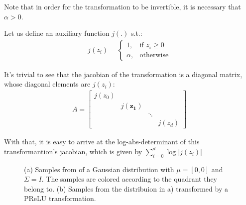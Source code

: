 Note that in order for the transformation to be invertible, it is necessary
that $\alpha > 0$.

Let us define an auxiliary function $j(.)$ s.t.:
\begin{align}
j(z_i) =
    \begin{cases}
       1 ,              & \text{if } z_i \geq 0\\
       \alpha ,       & \text{otherwise}
    \end{cases}
\end{align}

It's trivial to see that the jacobian of the transformation is a diagonal
matrix, whose diagonal elements are $j(z_i)$:
\begin{align}
  A =
  \begin{bmatrix}
      j(z_0) & & & \\
      & j(\mathbf{z_1}) & & \\
      & & \ddots & \\
      & & & j(z_d)
  \end{bmatrix}
\end{align}

With that, it is easy to arrive at the log-abs-determinant of this transformantion's
jacobian, which is given by $\sum_{i=0}^d \log \Big| j(z_i) \Big|$

\begin{figure}[!htb]
  \begin{subfigmatrix}{2}
  \end{subfigmatrix}
    \caption{(a) Samples from of a Gaussian distribution with $\mu = [0, 0]$ and $\Sigma = I$.
    The samples are colored according to the quadrant they belong to. (b) Samples from the
    distribuion in a) transformed by a PReLU transformation.}
  \label{fig:prelu}
\end{figure}


